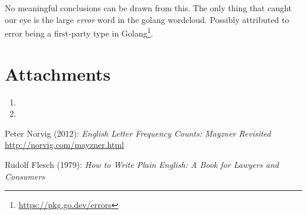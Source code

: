 \documentclass[]{article}
\begin{document}
No meaningful conclusions can be drawn from this. The only thing that caught our eye is the large \emph{error} word in the golang wordcloud. Possibly attributed to error being a first-party type in Golang\footnote{\url{https://pkg.go.dev/errors}}.


\section{Attachments} \label{attachments}

\begin{enumerate}
    \item %
    \item %
\end{enumerate}


\begin{thebibliography}{9}
    Peter Norvig (2012): \emph{English Letter Frequency Counts: Mayzner Revisited} \url{http://norvig.com/mayzner.html}

    Rudolf Flesch (1979): \emph{How to Write Plain English: A Book for Lawyers and Consumers}
\end{thebibliography}
\end{document}
